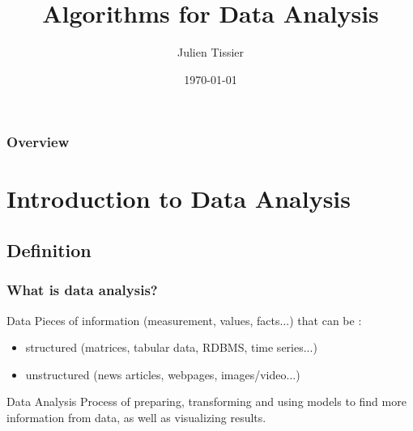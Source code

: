 \documentclass{beamer}
\title[Algorithms for Data Analysis]{Algorithms for Data Analysis}
\author{Julien Tissier}
\date{\today}
\begin{document}


\section*{\insertshortauthor} %
\subsection*{\insertshorttitle}

\begin{frame}
    \titlepage
\end{frame}

\begin{frame}
  \frametitle{Overview}
    \tableofcontents
\end{frame}


\section{Introduction to Data Analysis}

\subsection{Definition}
\begin{frame}
  \frametitle{What is data analysis?}
  \begin{block}{Data}
    Pieces of information (measurement, values, facts...) that can be :
    \begin{itemize}
      \item structured (matrices, tabular data, RDBMS, time series...)
      \item unstructured (news articles, webpages, images/video...)
    \end{itemize}
  \end{block}
  \begin{block}{Data Analysis}
  Process of preparing, transforming and using models to find more information
  from data, as well as visualizing results.
  \end{block}
\end{frame}
\end{document}

